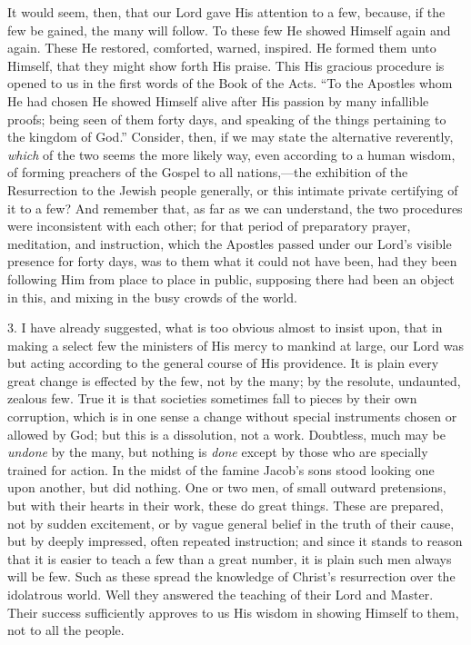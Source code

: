 It would seem, then, that our Lord gave His attention
to a few, because, if the few be gained, the many will
follow. To these few He showed Himself again and again.
These He restored, comforted, warned, inspired. He formed
them unto Himself, that they might show forth His praise.
This His gracious procedure is opened to us in the first
words of the Book of the Acts. ``To the Apostles whom
He had chosen He showed Himself alive after His passion
by many infallible proofs; being seen of them forty days,
and speaking of the things pertaining to the kingdom of
God.'' Consider, then, if we may state the
alternative reverently, \emph{which} of the two seems the
more likely way, even according to a human wisdom, of
forming preachers of the Gospel to all nations,—the
exhibition of the Resurrection to the Jewish people
generally, or this intimate private certifying of it to a
few? And remember that, as far as we can understand, the
two procedures were inconsistent with each other; for
that period of preparatory prayer, meditation, and
instruction, which the Apostles passed under our Lord's
visible presence for forty days, was to them what it
could not have been, had they been following Him from
place to place in public, supposing there had been an
object in this, and mixing in the busy crowds of the
world.

3. I have already suggested, what is too obvious
almost to insist upon, that in making a select few the
ministers of His mercy to mankind at large, our Lord was
but acting according to the general course of His
providence. It is plain every great change is effected by
the few, not by the many; by the resolute, undaunted, zealous few. True it is that societies sometimes fall to
pieces by their own corruption, which is in one sense a
change without special instruments chosen or allowed by
God; but this is a dissolution, not a work. Doubtless,
much may be \emph{undone} by the many, but nothing is \emph{done}
except by those who are specially trained for action. In
the midst of the famine Jacob's sons stood looking one
upon another, but did nothing. One or two men, of small
outward pretensions, but with their hearts in their work,
these do great things. These are prepared, not by sudden
excitement, or by vague general belief in the truth of
their cause, but by deeply impressed, often repeated
instruction; and since it stands to reason that it is
easier to teach a few than a great number, it is plain
such men always will be few. Such as these spread the
knowledge of Christ's resurrection over the idolatrous
world. Well they answered the teaching of their Lord and
Master. Their success sufficiently approves to us His
wisdom in showing Himself to them, not to all the people.

